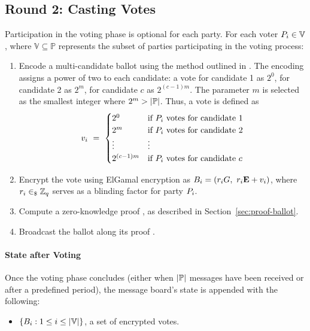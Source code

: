 \documentclass[runningheads]{llncs}
\begin{document}
\subsection{Round 2: Casting Votes}

Participation in the voting phase is optional for each party. For each voter $P_{i} \in \mathbb{V}$, where $\mathbb{V} \subseteq  \mathbb{P}$ represents the subset of parties participating in the voting process:

\begin{enumerate}
    \item Encode a multi-candidate ballot using the method outlined in \cite{baudronPracticalMulticandidateElection2001}. The encoding assigns a power of two to each candidate: a vote for candidate 1 as $2^0$, for candidate 2 as $2^m$, for candidate $c$ as $2^{(c-1)m}$. The parameter $m$ is selected as the smallest integer where $2^m > |\mathbb{P}{}|$. Thus, a vote is defined as \[v_{i}\ =\ \begin{cases} 2^0 & \text{if } P_{i} \text{ votes for candidate 1} \\ 2^m & \text{if } P_{i} \text{ votes for candidate 2} \\ \vdots & \vdots \\ 2^{(c-1)m} & \text{if } P_{i} \text{ votes for candidate $c$}\end{cases}\]
    
    \item Encrypt the vote using ElGamal encryption as $\Ballot{i} = (\BlindingFactor{i} \G,\ \BlindingFactor{i} \EncryptionKey{} + \Vote{i})$, where $r_{i} \in_{\$} \mathbb{Z}_q$ serves as a blinding factor for party $P_{i}$.
    
    \item Compute a zero-knowledge proof , as described in Section~\ref{sec:proof-ballot}.
    
    \item Broadcast the ballot  along its proof .
\end{enumerate}

\paragraph{State after Voting}

Once the voting phase concludes (either when $|\mathbb{P}|$ messages have been received or after a predefined period), the message board's state is appended with the following:
\begin{itemize}
    \item $\{B_{i} : 1 \leq i \leq |\mathbb{V}|\}$, a set of encrypted votes.
\end{itemize}
\end{document}

